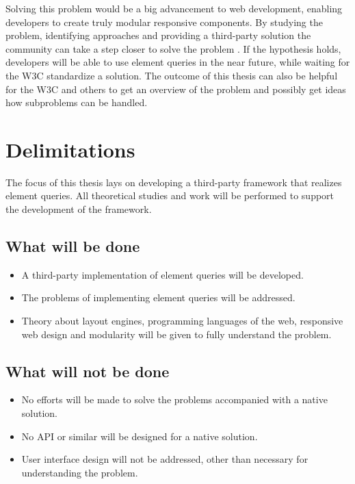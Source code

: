 \documentclass[a4paper,11pt]{kth-mag}
\begin{document}
      Solving this problem would be a big advancement to \gls{web} development, enabling developers to create truly modular \gls{responsive} components.
      By studying the problem, identifying approaches and providing a \gls{third-party} solution the community can take a step closer to solve the problem .
      If the hypothesis holds, developers will be able to use element queries in the near future, while waiting for the \gls{W3C} standardize a solution. 
      The outcome of this thesis can also be helpful for the \gls{W3C} and others to get an overview of the problem and possibly get ideas how subproblems can be handled.
    \section{Delimitations}
      The focus of this thesis lays on developing a \gls{third-party} framework that realizes element queries.
      All theoretical studies and work will be performed to support the development of the framework.

      \subsection{What will be done}
      \begin{itemize}
      \item A \gls{third-party} implementation of element queries will be developed.
      \item The problems of implementing element queries  will be addressed.
      \item Theory about \glspl{layout engine}, programming languages of the web, \gls{responsive} \gls{web} design and modularity will be given to fully understand the problem.
      \end{itemize}

      \subsection{What will not be done}
      \begin{itemize}
      \item No efforts will be made to solve the problems accompanied with a \gls{native} solution.
      \item No \gls{API} or similar will be designed for a \gls{native} solution.
      \item User interface design will not be addressed, other than necessary for understanding the problem.
      \end{itemize}
\end{document}
